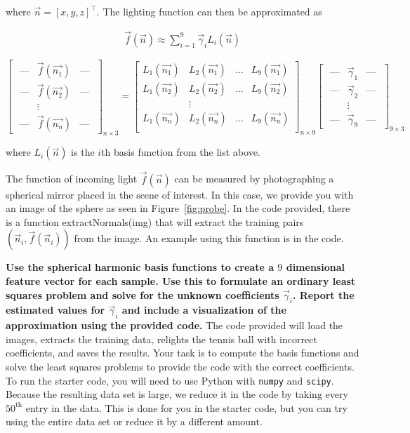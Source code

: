 \documentclass[preview]{standalone}
\begin{document}
\begin{Parts}
	where $\vec{n}=[x,y,z]^\top$.  The lighting function can then be approximated as
	
	
		\begin{align*}
		\vec{f}(\vec{n}) \approx\sum_{i=1}^9 \vec{\gamma}_i L_i(\vec{n})
					\end{align*}
	
	
	\[
	\begin{bmatrix}
	\text{ ---} & \vec{f}(\vec{n_1}) & \text{--- } \\
	\text{ ---} & \vec{f}(\vec{n_2}) & \text{--- } \\
	& \vdots & \\
	\text{ ---} & \vec{f}(\vec{n_n}) & \text{--- }
	\end{bmatrix}_{n \times 3}
	=
	\begin{bmatrix}
	L_1(\vec{n_1}) &L_2(\vec{n_1}) & ... & L_9(\vec{n_1}) \\
	L_1(\vec{n_2}) & L_2(\vec{n_2}) & ... & L_9(\vec{n_2}) \\
	& \vdots & \\
	L_1(\vec{n_n}) & L_2(\vec{n_n}) & ... & L_9(\vec{n_n}) \\
	\end{bmatrix}_{n \times 9}
	\begin{bmatrix}
	\text{ ---} & \vec{\gamma}_1 & \text{--- } \\
	\text{ ---} & \vec{\gamma}_2 & \text{--- } \\
	& \vdots & \\
	\text{ ---} & \vec{\gamma}_9 & \text{--- }
	\end{bmatrix}_{9 \times 3}
	\]
	
	
	where $L_i(\vec{n})$ is the $i$th basis function from the list above. 
	
	The function of incoming light $\vec{f}(\vec{n})$ can be measured by photographing a spherical mirror placed in the scene of interest.  In this case, we provide you with an image of the sphere as seen in Figure~\ref{fig:probe}.  In the code provided, there is a function extractNormals(img) that will extract the training pairs $(\vec{n}_i,\vec{f}(\vec{n}_i))$ from the image.  An example using this function is in the code.
	
	\textbf{Use the spherical harmonic basis functions to create a $9$ dimensional feature vector for each sample.  Use this to formulate an ordinary least squares problem and solve for the unknown coefficients $\vec{\gamma}_i$.  Report the estimated values for $\vec{\gamma}_i$ and include a visualization of the approximation using the provided code.} The code provided will load the images, extracts the training data, relights the tennis ball with incorrect coefficients, and saves the results.  Your task is to compute the basis functions and solve the least squares problems to provide the code with the correct coefficients.  To run the starter code, you will need to use Python with \texttt{numpy} and \texttt{scipy}.  Because the resulting data set is large, we reduce it in the code by taking every $50^\text{th}$ entry in the data.  This is done for you in the starter code, but you can try using the entire data set or reduce it by a different amount.
	

\end{Parts}
\end{document}

